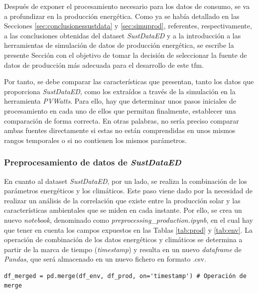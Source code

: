 Después de exponer el procesamiento necesario para los datos de consumo, se va a profundizar en la producción energética. Como ya se había detallado en las Secciones \ref{sec:conclusionessustdata} y \ref{sec:simuprod},  referentes, respectivamente, a las conclusiones obtenidas del dataset \textit{SustDataED} y a la introducción a las herramientas de simulación de datos de producción energética, se escribe la presente Sección con el objetivo de tomar la decisión de seleccionar la fuente de datos de producción más adecuada para el desarrollo de este \gls{tfm}.

\vspace{3mm}

Por tanto, se debe comparar las características que presentan, tanto los datos que proporciona \textit{SustDataED}, como los extraídos a través de la simulación en la herramienta \textit{PVWatts}. Para ello, hay que determinar unos pasos iniciales de procesamiento en cada uno de ellos que permitan finalmente, establecer una comparación de forma correcta. En otras palabras, no sería preciso comparar ambas fuentes directamente si estas no están comprendidas en unos mismos rangos temporales o si no contienen los mismos parámetros. 

\subsubsection{Preprocesamiento de datos de \textit{SustDataED}}
\label{sec:preprocsust}

En cuanto al dataset \textit{SustDataED}, por un lado, se realiza la combinación de los parámetros energéticos y los climáticos. Este paso viene dado por la necesidad de realizar un análisis de la correlación que existe entre la producción solar y las características ambientales que se miden en cada instante. Por ello, se crea un nuevo \textit{notebook}, denominado como \textit{preprocessing\_production.ipynb}, en el cual hay que tener en cuenta los campos expuestos en las Tablas \ref{tab:prod} y \ref{tab:env}. La operación de combinación de los datos energéticos y climáticos se determina a partir de la marca de tiempo (\textit{timestamp}) y resulta en un nuevo \textit{dataframe} de \textit{Pandas}, que será almacenado en un nuevo fichero en formato .csv.

\begin{lstlisting}[style=Python, caption={Combinación de datos de clima y de producción}]
  df_merged = pd.merge(df_env, df_prod, on='timestamp') # Operación de merge
\end{lstlisting}

